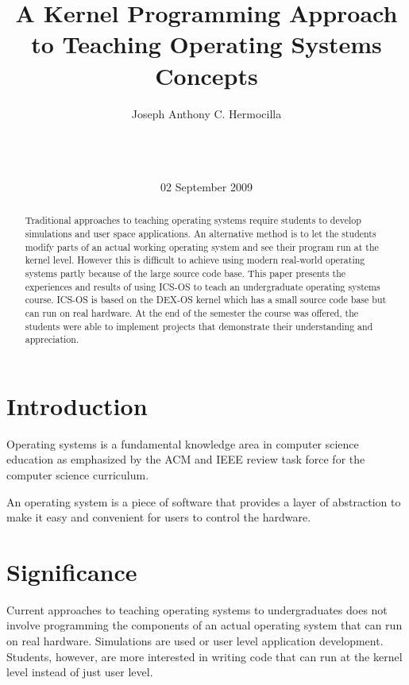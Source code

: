 \documentclass{acm_proc_article-sp}
\begin{document}
\title{A Kernel Programming Approach to Teaching Operating Systems Concepts}

\author{
\alignauthor
Joseph Anthony C. Hermocilla\\
       \\
       \\
       \\
\alignauthor
}
\date{02 September 2009}

\maketitle
\begin{abstract}
Traditional approaches to teaching operating systems require students to
develop simulations and user space applications. An alternative method
is to let the students modify parts of an actual working operating system
and see their program run at the kernel level. However this is difficult to 
achieve using modern real-world operating systems partly because of the large 
source code base. This paper presents the experiences and results of using 
ICS-OS to teach an undergraduate operating systems course. ICS-OS is based on 
the DEX-OS kernel which has a small source code base but can run on real
hardware. At the end of the semester the course was offered, the students 
were able to implement projects that demonstrate their understanding
and appreciation.
\end{abstract}


\section{Introduction}
Operating systems is a fundamental knowledge area in computer science education
as emphasized by the ACM and IEEE review task force for the computer science 
curriculum. 

An operating system is a piece of software that provides a layer 
of abstraction to make it easy and convenient for users to control the hardware.

\section{Significance}
Current approaches to teaching operating systems to undergraduates does not
involve programming the components of an actual operating system that can run
on real hardware. Simulations are used or user level application development.
Students, however, are more interested in writing code that can run at the
kernel level instead of just user level. 
\end{document}
